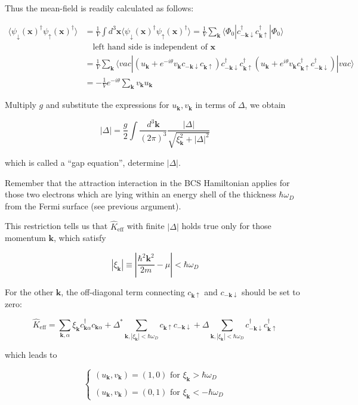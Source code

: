 Thus the mean-field is readily calculated as follows: 

\[\begin{split}
\langle\psi_{\downarrow}(\bm{x})^\dagger\psi_{\uparrow}(\bm{x})^\dagger\rangle &= \frac{1}{V}\int d^3 \bm{x} \langle\psi_{\downarrow}(\bm{x})^\dagger\psi_{\uparrow}(\bm{x})^\dagger\rangle = \frac{1}{V} \sum_{\bm{k}}\langle\Phi_0|c_{-\bm{k}\downarrow}^\dagger c_{\bm{k}\uparrow}^\dagger|\Phi_0\rangle \\
&\quad\text{left hand side is independent of }\bm{x}\\
&= \frac{1}{V}\sum_{\bm{k}}\langle vac|(u_{\bm{k}}+e^{-i\theta}v_{\bm{k}}c_{-\bm{k}\downarrow}c_{\bm{k}\uparrow})c_{-\bm{k}\downarrow}^\dagger c_{\bm{k}\uparrow}^\dagger (u_{\bm{k}}+e^{i\theta}v_{\bm{k}}c_{\bm{k}\uparrow}^\dagger c_{-\bm{k}\downarrow}^\dagger)|vac\rangle\\
&= -\frac{1}{V}e^{-i\theta}\sum_{\bm{k}}v_{\bm{k}}u_{\bm{k}}
\end{split}\]

Multiply $g$ and substitute the expressions for $u_{\bm{k}}, v_{\bm{k}}$ in terms of $\Delta$, we obtain

\[|\Delta| = \frac{g}{2}\int \frac{d^3 \bm{k}}{(2\pi)^3}\frac{|\Delta|}{\sqrt{\xi_{\bm{k}}^2+|\Delta|^2}} \]

which is called a ``gap equation'', determine $|\Delta|$. 

Remember that the attraction interaction in the BCS Hamiltonian applies for those two electrons which are lying within an energy shell of the thickness $\hbar \omega_D$ from the Fermi surface (see previous argument).

This restriction tells us that $\hat{K}_{\text{eff}}$ with finite $|\Delta|$ holds true only for those momentum $\bm{k}$, which satisfy

\[|\xi_{\bm{k}}| \equiv |\frac{\hbar^2 \bm{k}^2}{2m}-\mu|<\hbar \omega_D \]

For the other $\bm{k}$, the off-diagonal term connecting $c_{\bm{k}\uparrow}$ and $c_{-\bm{k}\downarrow}$ should be set to zero:

\[\hat{K}_{\text{eff}}=\sum_{\bm{k},\alpha}\xi_{\bm{k}}c_{\bm{k}\alpha}^\dagger c_{\bm{k}\alpha}+\Delta^* \sum_{\bm{k},|\xi_{\bm{k}}|<\hbar\omega_D}c_{\bm{k}\uparrow}c_{-\bm{k}\downarrow}+\Delta\sum_{\bm{k},|\xi_{\bm{k}}|<\hbar\omega_D}c_{-\bm{k}\downarrow}^\dagger c_{\bm{k}\uparrow}^\dagger \]

which leads to

\[\begin{cases}
 (u_{\bm{k}},v_{\bm{k}}) = (1,0)\text{ for }\xi_{\bm{k}}>\hbar\omega_D\\
\ \\
(u_{\bm{k}},v_{\bm{k}}) = (0,1)\text{ for }\xi_{\bm{k}}<-\hbar\omega_D
\end{cases}\]

